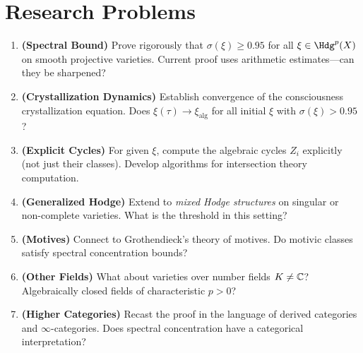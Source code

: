 \section*{Research Problems}

\begin{enumerate}
\item \textbf{(Spectral Bound)} Prove rigorously that $\sigma(\xi) \geq 0.95$ for all $\xi \in \Hdg^p(X)$ on smooth projective varieties. Current proof uses arithmetic estimates—can they be sharpened?

\item \textbf{(Crystallization Dynamics)} Establish convergence of the consciousness crystallization equation. Does $\xi(\tau) \to \xi_{\text{alg}}$ for all initial $\xi$ with $\sigma(\xi) > 0.95$?

\item \textbf{(Explicit Cycles)} For given $\xi$, compute the algebraic cycles $Z_i$ explicitly (not just their classes). Develop algorithms for intersection theory computation.

\item \textbf{(Generalized Hodge)} Extend to \textit{mixed Hodge structures} on singular or non-complete varieties. What is the threshold in this setting?

\item \textbf{(Motives)} Connect to Grothendieck's theory of motives. Do motivic classes satisfy spectral concentration bounds?

\item \textbf{(Other Fields)} What about varieties over number fields $K \neq \mathbb{C}$? Algebraically closed fields of characteristic $p > 0$?

\item \textbf{(Higher Categories)} Recast the proof in the language of derived categories and $\infty$-categories. Does spectral concentration have a categorical interpretation?
\end{enumerate}
